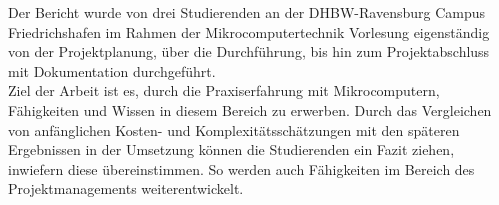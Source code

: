 
\label{kurzfassung}

Der Bericht wurde von drei Studierenden an der \ac{DHBW}-Ravensburg Campus Friedrichshafen im Rahmen der Mikrocomputertechnik Vorlesung eigenständig von der Projektplanung, über die Durchführung, bis hin zum Projektabschluss mit Dokumentation durchgeführt. \\
Ziel der Arbeit ist es, durch die Praxiserfahrung mit Mikrocomputern, Fähigkeiten und Wissen in diesem Bereich zu erwerben. Durch das Vergleichen von anfänglichen Kosten- und Komplexitätsschätzungen mit den späteren Ergebnissen in der Umsetzung können die Studierenden ein Fazit ziehen, inwiefern diese übereinstimmen. So werden auch Fähigkeiten im Bereich des Projektmanagements weiterentwickelt. \\
